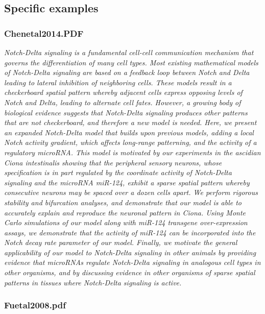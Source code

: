 \documentclass[graybox]{svmult}
\begin{document}
\subsection{Specific examples} 
\subsubsection{Chenetal2014.PDF}
\cite{Chen2014}
\textit{Notch-Delta signaling is a fundamental cell-cell communication mechanism 
that governs the differentiation of many cell types. Most existing mathematical 
models of Notch-Delta signaling are based on a feedback loop between Notch and 
Delta leading to lateral inhibition of neighboring cells. These models result in 
a checkerboard spatial pattern whereby adjacent cells express opposing levels of 
Notch and Delta, leading to alternate cell fates. However, a growing body of 
biological evidence suggests that Notch-Delta signaling produces other patterns 
that are not checkerboard, and therefore a new model is needed. Here, we present 
an expanded Notch-Delta model that builds upon previous models, adding a local 
Notch activity gradient, which affects long-range patterning, and the activity 
of a regulatory microRNA. This model is motivated by our experiments in the 
ascidian Ciona intestinalis showing that the peripheral sensory neurons, whose 
specification is in part regulated by the coordinate activity of Notch-Delta 
signaling and the microRNA miR-124, exhibit a sparse spatial pattern whereby 
consecutive neurons may be spaced over a dozen cells apart. We perform rigorous 
stability and bifurcation analyses, and demonstrate that our model is able to 
accurately explain and reproduce the neuronal pattern in Ciona. Using Monte 
Carlo simulations of our model along with miR-124 transgene over-expression 
assays, we demonstrate that the activity of miR-124 can be incorporated into the 
Notch decay rate parameter of our model. Finally, we motivate the general 
applicability of our model to Notch-Delta signaling in other animals by 
providing evidence that microRNAs regulate Notch-Delta signaling in analogous 
cell types in other organisms, and by discussing evidence in other organisms of 
sparse spatial patterns in tissues where Notch-Delta signaling is active.}

\subsubsection{Fuetal2008.pdf}
\end{document}
